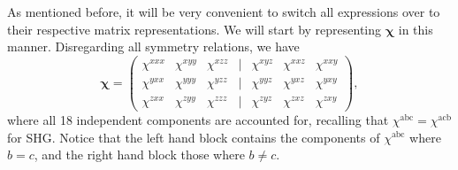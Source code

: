 \documentclass[aps,pra,10pt,amsmath,twocolumn,letterpaper]{revtex4-1}
\begin{document}
As mentioned before, it will be very convenient to switch all expressions over
to their respective matrix representations. We will start by representing
$\boldsymbol{\chi}$ in this manner. Disregarding all symmetry relations, we have
\begin{equation}\label{eq:chicomplete}
\boldsymbol{\chi} =
\begin{pmatrix}
\chi^{xxx}&\chi^{xyy}&\chi^{xzz} &|& \chi^{xyz}&\chi^{xxz}&\chi^{xxy} \\[3pt]
\chi^{yxx}&\chi^{yyy}&\chi^{yzz} &|& \chi^{yyz}&\chi^{yxz}&\chi^{yxy} \\[3pt]
\chi^{zxx}&\chi^{zyy}&\chi^{zzz} &|& \chi^{zyz}&\chi^{zxz}&\chi^{zxy}
\end{pmatrix}
,
\end{equation}
where all 18 independent components are accounted for, recalling that
$\chi^{\mathrm{abc}} = \chi^{\mathrm{acb}}$ for SHG. Notice that the left hand
block contains the components of $\chi^{\mathrm{abc}}$ where $b = c$, and the
right hand block those where $b \neq c$.
\end{document}
